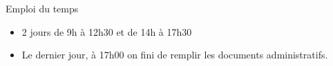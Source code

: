 \begin{frame}{Emploi du temps}
  \begin{itemize}
  \item 2 jours de 9h à 12h30 et de 14h à 17h30
  \item Le dernier jour, à 17h00 on fini de remplir les documents administratifs.
  \end{itemize}
\end{frame}
